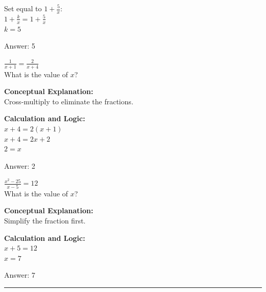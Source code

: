 \documentclass[11pt,paper=a4,answers]{exam}
\begin{document}
\begin{questions}
\begin{solution}
\vspace{10pt}

Set equal to $1 + \frac{5}{x}$: \\
$1 + \frac{k}{x} = 1 + \frac{5}{x}$ \\
$k = 5$

\vspace{25pt}

Answer: \colorbox{yellow!100}{5}
\end{solution}

\vspace{40pt}

\question
$\frac{1}{x+1} = \frac{2}{x+4}$ \\
What is the value of $x$?

\begin{solution}
\textbf{Conceptual Explanation:} \\
Cross-multiply to eliminate the fractions.

\vspace{20pt}

\textbf{Calculation and Logic:} \\
$x + 4 = 2(x + 1)$ \\
$x + 4 = 2x + 2$ \\
$2 = x$

\vspace{25pt}

Answer: \colorbox{yellow!100}{2}
\end{solution}

\vspace{40pt}

\question
$\frac{x^2-25}{x-5} = 12$ \\
What is the value of $x$?

\begin{solution}
\textbf{Conceptual Explanation:} \\
Simplify the fraction first.

\vspace{20pt}

\textbf{Calculation and Logic:} \\
$x + 5 = 12$ \\
$x = 7$

\vspace{25pt}

Answer: \colorbox{yellow!100}{7}
\end{solution}

\end{questions}
\begin{center}
\rule{.5\textwidth}{1pt}
\end{center}
\end{document}

